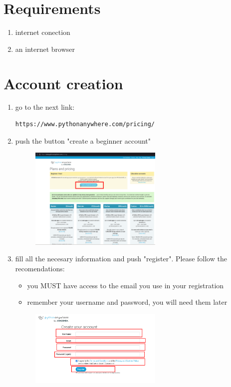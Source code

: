 \documentclass[12pt]{article}
\begin{document}
\setcounter{page}{1}%
\section{Requirements}
\begin{enumerate}
	\item internet conection
  \item an internet browser
\end{enumerate}

\section{Account creation}
	\begin{enumerate}
    \item go to the next link:
			\begin{lstlisting}[caption=\phantom{},style=conlst,label={lst:enter_desktop}]
      https://www.pythonanywhere.com/pricing/
			\end{lstlisting}

    \item push the button "create a beginner account"

	\begin{figure}[H]
		\centering
		\includegraphics[width=0.6\textwidth ,keepaspectratio]{imgs/create_beginner_account.png}
		\caption{}
	\end{figure}

    \item fill all the necesary information and push "register". Please follow the recomendations:
      \begin{itemize}
        \item you MUST have access to the email you use in your registration 
        \item remember your username and password, you will need them later
          \end{itemize}
	\begin{figure}[H]
		\centering
		\includegraphics[width=0.6\textwidth ,keepaspectratio]{imgs/fill_reg_info.png}
		\caption{}
	\end{figure}
	\end{enumerate}
\end{document}
